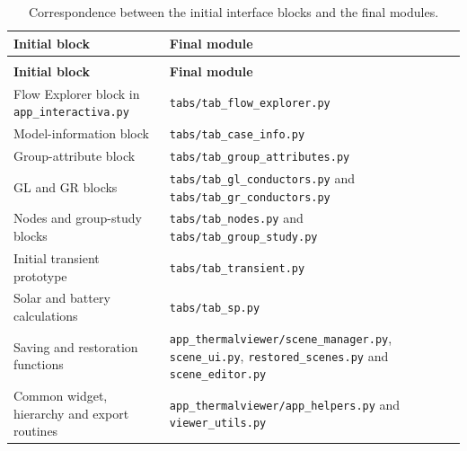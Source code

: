 \begingroup
\footnotesize
\renewcommand{\arraystretch}{1.06}
\setlength{\tabcolsep}{3pt}
\begin{longtable}{|>{\raggedright\arraybackslash}p{}|>{\raggedright\arraybackslash}p{}|}
    \caption{Correspondence between the initial interface blocks and the final modules.}
    \label{tab:appendix_code_reorganisation}\\
    \hline
    \textbf{Initial block} & \textbf{Final module} \\
    \hline
    \endfirsthead

    \multicolumn{2}{c}{\tablename\ \thetable\ -- continued}\\
    \hline
    \textbf{Initial block} & \textbf{Final module} \\
    \hline
    \endhead

    \hline
    \endfoot

    Flow Explorer block in \texttt{app\_interactiva.py} &
    \texttt{tabs/tab\_flow\_explorer.py} \\
    \hline
    Model-information block &
    \texttt{tabs/tab\_case\_info.py} \\
    \hline
    Group-attribute block &
    \texttt{tabs/tab\_group\_attributes.py} \\
    \hline
    GL and GR blocks &
    \texttt{tabs/tab\_gl\_conductors.py} and
    \texttt{tabs/tab\_gr\_conductors.py} \\
    \hline
    Nodes and group-study blocks &
    \texttt{tabs/tab\_nodes.py} and
    \texttt{tabs/tab\_group\_study.py} \\
    \hline
    Initial transient prototype &
    \texttt{tabs/tab\_transient.py} \\
    \hline
    Solar and battery calculations &
    \texttt{tabs/tab\_sp.py} \\
    \hline
    Saving and restoration functions &
    \texttt{app\_thermalviewer/scene\_manager.py},
    \texttt{scene\_ui.py}, \texttt{restored\_scenes.py} and
    \texttt{scene\_editor.py} \\
    \hline
    Common widget, hierarchy and export routines &
    \texttt{app\_thermalviewer/app\_helpers.py} and
    \texttt{viewer\_utils.py} \\
    \hline
\end{longtable}
\endgroup

